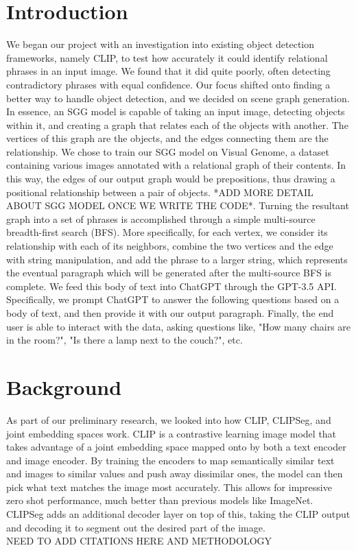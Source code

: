 \documentclass[letterpaper, 10 pt, conference]{ieeeconf}  %
\begin{document}
\section{Introduction}
    We began our project with an investigation into existing object detection frameworks, namely CLIP, to test how accurately it could identify relational phrases in an input image. We found that it did quite poorly, often detecting contradictory phrases with equal confidence. Our focus shifted onto finding a better way to handle object detection, and we decided on scene graph generation. In essence, an SGG model is capable of taking an input image, detecting objects within it, and creating a graph that relates each of the objects with another. The vertices of this graph are the objects, and the edges connecting them are the relationship. We chose to train our SGG model on Visual Genome, a dataset containing various images annotated with a relational graph of their contents. In this way, the edges of our output graph would be prepositions, thus drawing a positional relationship between a pair of objects. *ADD MORE DETAIL ABOUT SGG MODEL ONCE WE WRITE THE CODE*. Turning the resultant graph into a set of phrases is accomplished through a simple multi-source breadth-first search (BFS). More specifically, for each vertex, we consider its relationship with each of its neighbors, combine the two vertices and the edge with string manipulation, and add the phrase to a larger string, which represents the eventual paragraph which will be generated after the multi-source BFS is complete. We feed this body of text into ChatGPT through the GPT-3.5 API. Specifically, we prompt ChatGPT to answer the following questions based on a body of text, and then provide it with our output paragraph. Finally, the end user is able to interact with the data, asking questions like, "How many chairs are in the room?", "Is there a lamp next to the couch?", etc.

\section{Background}
    As part of our preliminary research, we looked into how CLIP, CLIPSeg, and joint embedding spaces work. CLIP is a contrastive learning image model that takes advantage of a joint embedding space mapped onto by both a text encoder and image encoder. By training the encoders to map semantically similar text and images to similar values and push away dissimilar ones, the model can then pick what text matches the image most accurately. This allows for impressive zero shot performance, much better than previous models like ImageNet. CLIPSeg adds an additional decoder layer on top of this, taking the CLIP output and decoding it to segment out the desired part of the image.
    \\
    NEED TO ADD CITATIONS HERE AND METHODOLOGY
\end{document}
